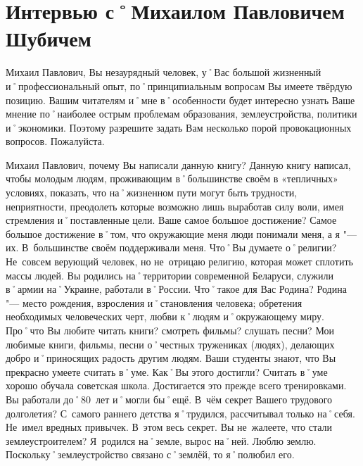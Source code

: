 ﻿\chapter[Интервью с М.\,П.~Шубичем]{Интервью с˚Михаилом Павловичем Шубичем}

\begin{drama}
	\setlength{\speaksindent}{5em}
	\setlength{\Dlabelsep}{5em}
	
	\maxspeaks Михаил Павлович, Вы незаурядный человек, у˚Вас большой жизненный и˚профессиональный опыт, по˚принципиальным вопросам Вы имеете твёрдую позицию. Вашим читателям и˚мне в˚особенности будет интересно узнать Ваше мнение по˚наиболее острым проблемам образования, землеустройства, политики и˚экономики. Поэтому разрешите задать Вам несколько порой провокационных вопросов.
	\michaelspeaks Пожалуйста.
	
	\maxspeaks Михаил Павлович, почему Вы написали данную книгу?
	\michaelspeaks Данную книгу написал, чтобы молодым людям, проживающим в˚большинстве своём в «тепличных» условиях, показать, что на˚жизненном пути могут быть трудности, неприятности, преодолеть которые возможно лишь выработав силу воли, имея стремления и˚поставленные цели.
	\maxspeaks Ваше самое большое достижение?
	\michaelspeaks Самое большое достижение в˚том, что окружающие меня люди понимали меня, а я "--- их. В~большинстве своём поддерживали меня.
	\maxspeaks Что˚Вы думаете о˚религии? 
	\michaelspeaks Не~совсем верующий человек, но не~отрицаю религию, которая может сплотить массы людей.
	\maxspeaks Вы родились на˚территории современной Беларуси, служили в˚армии на˚Украине, работали в˚России. Что˚такое для Вас Родина?
	\michaelspeaks Родина "--- место рождения, взросления и˚становления человека; обретения необходимых человеческих черт, любви к˚людям и˚окружающему миру.
	\maxspeaks Про˚что Вы любите читать книги? смотреть фильмы? слушать песни?
	\michaelspeaks Мои любимые книги, фильмы, песни о˚честных тружениках (людях), делающих добро и˚приносящих радость другим людям.
	\maxspeaks Ваши студенты знают, что Вы прекрасно умеете считать в˚уме. Как˚Вы этого достигли?
	\michaelspeaks Считать в˚уме хорошо обучала советская школа. Достигается это прежде всего тренировками.
	\maxspeaks Вы работали до˚80~лет и˚могли бы˚ещё. В~чём секрет Вашего трудового долголетия?
	\michaelspeaks С~самого раннего детства я˚трудился, рассчитывал только на˚себя. Не~имел вредных привычек. В~этом весь секрет. 
	\maxspeaks Вы не~жалеете, что стали землеустроителем?
	\michaelspeaks Я~родился на˚земле, вырос на˚ней. Люблю землю. Поскольку˚землеустройство связано с˚землёй, то я˚полюбил его.
	

\end{drama}
